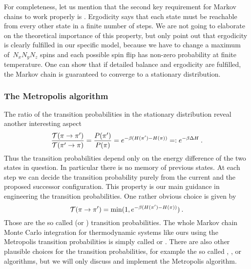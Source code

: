 For completeness, let us mention that the second key requirement for Markov
chains to work properly is . Ergodicity says that each state
must be reachable from every other state in a finite number of steps. We are
not going to elaborate on the theoretical importance of this property, but only
point out that ergodicity is clearly fulfilled in our specific model, because we
have to change a maximum of~$N_x N_y N_z$ spins and each possible spin flip has
non-zero probability at finite temperature. One can show that if detailed
balance and ergodicity are fulfilled, the Markov chain is guaranteed to converge
to a stationary distribution.

\subsubsection{The Metropolis algorithm}

The ratio of the transition probabilities in the stationary distribution reveal
another interesting aspect
%
\begin{equation}
  \frac{\mathcal{T}(\pi \to \pi')}{\mathcal{T}(\pi' \to \pi)} = \frac{P(\pi')}{P(\pi)} =
  e^{-\beta (H(\pi') - H(\pi))} =: e^{-\beta \Delta H}\:.
\end{equation}
%
Thus the transition probabilities depend only on the energy difference of the
two states in question. In particular there is no memory of previous states. At
each step we can decide the transition probability purely from the current and
the proposed successor configuration. This property is our main guidance in
engineering the transition probabilities. One rather obvious choice is given by
%
\begin{equation}
  \mathcal{T}(\pi \to \pi') = \min(1, e^{-\beta (H(\pi') - H(\pi))})\:.
\end{equation}
%
Those are the so called  (or )
transition probabilities. The whole Markov chain Monte Carlo integration for
thermodynamic systems like ours using the Metropolis transition probabilities is
simply called  or . There are also other plausible choices for the transition
probabilities, for example the so called , ,
or  algorithms, but we will only discuss and implement
the Metropolis algorithm.

